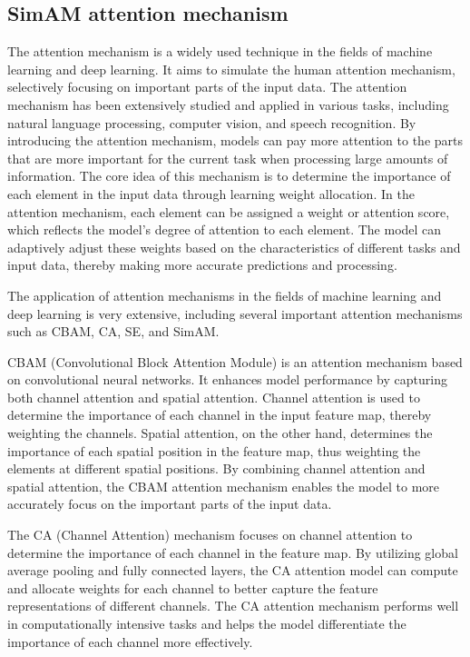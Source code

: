 \documentclass[aic]{iosart2x}
\begin{document}
\subsection{SimAM attention mechanism}

The attention mechanism is a widely used technique in the fields of machine learning and deep learning. It aims to simulate the human attention mechanism, selectively focusing on important parts of the input data. The attention mechanism has been extensively studied and applied in various tasks, including natural language processing, computer vision, and speech recognition. By introducing the attention mechanism, models can pay more attention to the parts that are more important for the current task when processing large amounts of information. The core idea of this mechanism is to determine the importance of each element in the input data through learning weight allocation. In the attention mechanism, each element can be assigned a weight or attention score, which reflects the model's degree of attention to each element. The model can adaptively adjust these weights based on the characteristics of different tasks and input data, thereby making more accurate predictions and processing.

The application of attention mechanisms in the fields of machine learning and deep learning is very extensive, including several important attention mechanisms such as CBAM, CA, SE, and SimAM. \cite{cheng2024enhancing,shen2023ca-yolo,jia2023mobilenet-ca-yolo,wu2023yolo-se,mahaadevan2023automatic}


CBAM (Convolutional Block Attention Module) is an attention mechanism based on convolutional neural networks. It enhances model performance by capturing both channel attention and spatial attention. Channel attention is used to determine the importance of each channel in the input feature map, thereby weighting the channels. Spatial attention, on the other hand, determines the importance of each spatial position in the feature map, thus weighting the elements at different spatial positions. By combining channel attention and spatial attention, the CBAM attention mechanism enables the model to more accurately focus on the important parts of the input data.

The CA (Channel Attention) mechanism focuses on channel attention to determine the importance of each channel in the feature map. By utilizing global average pooling and fully connected layers, the CA attention model can compute and allocate weights for each channel to better capture the feature representations of different channels. The CA attention mechanism performs well in computationally intensive tasks and helps the model differentiate the importance of each channel more effectively.
\end{document}
